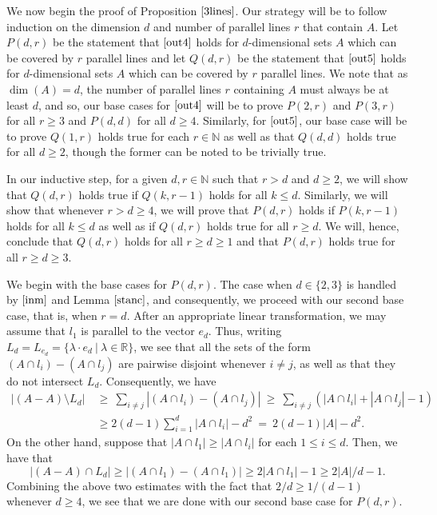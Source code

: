 We now begin the proof of Proposition $\ref{3lines}$. Our strategy will be to follow induction on the dimension $d$ and number of parallel lines $r$ that contain $A$.  Let $P(d,r)$ be the statement that $\eqref{out4}$ holds for $d$-dimensional sets $A$ which can be covered by $r$ parallel lines and let $Q(d,r)$ be the statement that $\eqref{out5}$ holds for $d$-dimensional sets $A$ which can be covered by $r$ parallel lines. We note that as $\dim(A) = d$, the number of parallel lines $r$ containing $A$ must always be at least $d$, and so, our base cases for $\eqref{out4}$ will be to prove $P(2,r)$ and $P(3,r)$ for all $r \geq 3$ and $P(d,d)$ for all $d \geq 4$. Similarly, for $\eqref{out5}$, our base case will be to prove $Q(1,r)$ holds true for each $r \in \mathbb{N}$ as well as that $Q(d,d)$ holds true for all $d \geq 2$, though the former can be noted to be trivially true.
\par

In our inductive step, for a given $d, r \in \mathbb{N}$ such that $r > d$ and $d \geq 2$, we will show that $Q(d,r)$ holds true if $Q(k,r-1)$ holds for all $k \leq d$. Similarly, we will show that whenever $r > d \geq 4$, we will prove that $P(d,r)$ holds if $P(k,r-1)$ holds for all $k \leq d$ as well as if $Q(d,r)$ holds true for all $r\geq d$. We will, hence, conclude that $Q(d,r)$ holds for all $r \geq d \geq 1$ and that $P(d,r)$ holds true for all $r \geq d \geq 3$.
\par

We begin with the base cases for $P(d,r)$. The case when $d \in \{2,3\}$ is handled by $\eqref{inm}$ and Lemma $\ref{stanc}$, and consequently, we proceed with our second base case, that is, when $r=d$. After an appropriate linear transformation, we may assume that $l_1$ is parallel to the vector $e_d$. Thus, writing $L_d = L_{e_d}= \{ \lambda \cdot e_d \ | \ \lambda \in \mathbb{R}\}$, we see that all the sets of the form $(A \cap l_i) - (A \cap l_j)$ are pairwise disjoint whenever $i \neq j$, as well as that they do not intersect $L_d $. Consequently, we have
\begin{align*}
|(A-A)\setminus L_d | & \ \geq \ \sum_{i \neq j} |(A \cap l_i) - (A \cap l_j)| \ \geq \ \sum_{i \neq j} (|A \cap l_i| + |A \cap l_j| - 1) \\
        & \ \geq 2(d-1) \sum_{i=1}^{d} |A \cap l_i|  - d^2 \ = \  2(d-1) |A| - d^2 .
\end{align*}
On the other hand, suppose that $|A \cap l_1| \geq |A \cap l_i|$ for each $1 \leq i \leq d$. Then, we have that
\[ |(A-A) \cap L_d | \geq |(A \cap l_1) - (A \cap l_1)|  \geq 2 |A \cap l_1| -1 \geq 2|A|/d -1. \]
Combining the above two estimates with the fact that $2/d \geq 1/(d-1)$ whenever $d \geq 4$, we see that we are done with our second base case for $P(d,r)$. 
\par

